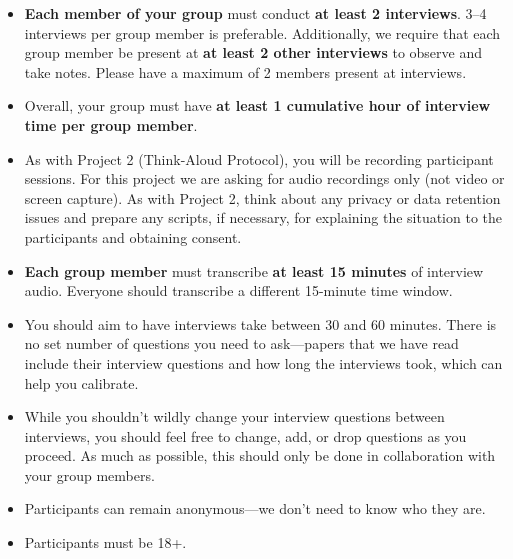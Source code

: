 \documentclass{article}
\begin{document}
\begin{itemize}
    \item \textbf{Each member of your group} must conduct \textbf{at least 2 interviews}. 3--4 interviews per group member is preferable. Additionally, we require that each group member be present at \textbf{at least 2 other interviews} to observe and take notes. Please have a maximum of 2 members present at interviews.
    
    \item Overall, your group must have \textbf{at least 1 cumulative hour of interview time per group member}.

    \item As with Project 2 (Think-Aloud Protocol), you will be recording participant sessions. For this project we are asking for audio recordings only (not video or screen capture). As with Project 2, think about any privacy or data retention issues and prepare any scripts, if necessary, for explaining the situation to the participants and obtaining consent.
    
    \item \textbf{Each group member} must transcribe \textbf{at least 15 minutes} of interview audio. Everyone should transcribe a different 15-minute time window.
    
    \item You should aim to have interviews take between 30 and 60 minutes. There is no set number of questions you need to ask---papers that we have read include their interview questions and how long the interviews took, which can help you calibrate.
    
    \item While you shouldn't wildly change your interview questions between interviews, you should feel free to change, add, or drop questions as you proceed. As much as possible, this should only be done in collaboration with your group members.
    
    \item Participants can remain anonymous---we don't need to know who they are. 
    
    \item Participants must be 18+.
    

\end{itemize}
\end{document}
